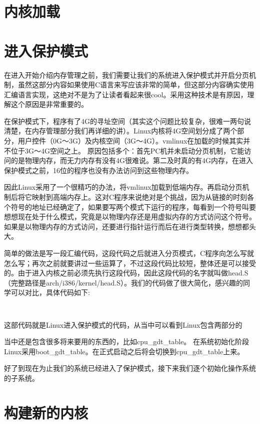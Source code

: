 \section{内核加载}

\section{进入保护模式}
在进入开始介绍内存管理之前，我们需要让我们的系统进入保护模式并开启分页机制，虽然这部分内容如果使用C语言来写应该非常的简单，但这部分内容确实使用汇编语言实现，这绝对不是为了让读者看起来很cool。采用这种技术是有原因，理解这个原因是非常重要的。

在保护模式下，程序有了4G的寻址空间（其实这个问题比较复杂，很难一两句说清楚，在内存管理部分我们再详细的讲）。Linux内核将4G空间划分成了两个部分，用户控件（0G～3G）及内核空间（3G～4G）。vmlinux在加载的时候其实并不位于3G～4G空间之上。
原因包括多个：首先PC机并未启动分页机制，它能访问的是物理内存，而无力内存有没有4G很难说。第二及时真的有4G内存，在进入保护模式之前，16位的程序也没有办法访问到这些物理内存。

因此Linux采用了一个很精巧的办法，将vmlinux加载到低端内存。再启动分页机制后将它映射到高端内存上。这对C程序来说绝对是个挑战，因为从链接的时刻各个符号的地址已经确定了，如果要写两个模式下运行的程序，每看到一个符号叫要想想现在处于什么模式，究竟是以物理内存还是用虚拟内存的方式访问这个符号。如果是以物理内存的方式访问，还要进行指针运行而后在进行类型转换，想想都头大。

简单的做法是写一段汇编代码，这段代码之后就进入分页模式，C程序向怎么写就怎么写；再次之前就要讲过一些运算了，不过这段代码比较短，整体还是可以接受的。由于进入内核之前必须先执行这段代码，因此这段代码的名字就叫做head.S（完整路径是arch/i386/kernel/head.S）。我们的代码做了很大简化，感兴趣的同学可以对比，具体代码如下:
\begin{lstlisting}
	
\end{lstlisting}
这部代码就是Linux进入保护模式的代码，从当中可以看到Linux包含两部分的

当中还是包含很多将来要用的东西的，比如cpu\_gdt\_table。 在系统初始化阶段Linux采用boot\_gdt\_table。在正式启动之后将会切换到cpu\_gdt\_table上来。

好了到现在为止我们的系统已经进入了保护模式，接下来我们逐个初始化操作系统的子系统。


\section{构建新的内核}

